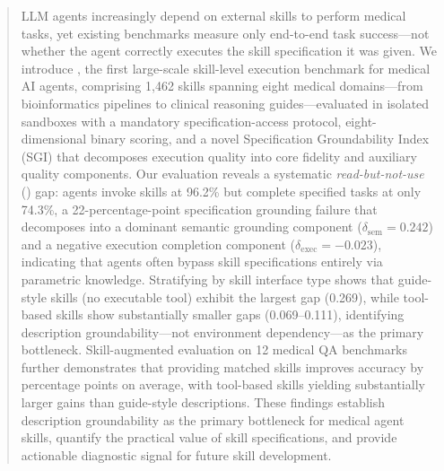 \begin{abstract}
LLM agents increasingly depend on external skills to perform medical tasks, yet existing benchmarks measure only end-to-end task success---not whether the agent correctly executes the skill specification it was given.
We introduce \medskillbench, the first large-scale skill-level execution benchmark for medical AI agents, comprising 1,462 skills spanning eight medical domains---from bioinformatics pipelines to clinical reasoning guides---evaluated in isolated sandboxes with a mandatory specification-access protocol, eight-dimensional binary scoring, and a novel Specification Groundability Index (\textsc{SGI}) that decomposes execution quality into core fidelity and auxiliary quality components.
Our evaluation reveals a systematic \emph{read-but-not-use} (\rbu) gap: agents invoke skills at 96.2\% but complete specified tasks at only 74.3\%, a 22-percentage-point specification grounding failure that decomposes into a dominant semantic grounding component ($\delta_{\text{sem}} = 0.242$) and a negative execution completion component ($\delta_{\text{exec}} = -0.023$), indicating that agents often bypass skill specifications entirely via parametric knowledge.
Stratifying by skill interface type shows that guide-style skills (no executable tool) exhibit the largest gap (0.269), while tool-based skills show substantially smaller gaps (0.069--0.111), identifying description groundability---not environment dependency---as the primary bottleneck.
Skill-augmented evaluation on 12 medical QA benchmarks further demonstrates that providing matched skills improves accuracy by  percentage points on average, with tool-based skills yielding substantially larger gains than guide-style descriptions.
These findings establish description groundability as the primary bottleneck for medical agent skills, quantify the practical value of skill specifications, and provide actionable diagnostic signal for future skill development.
\end{abstract}
